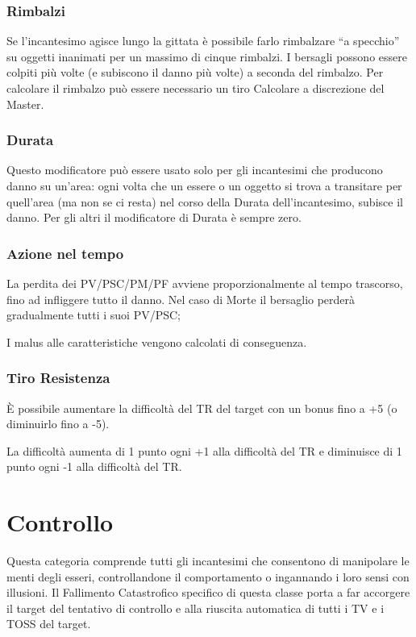 \subsubsection{Rimbalzi} Se l'incantesimo agisce lungo la gittata \`e possibile
farlo rimbalzare ``a specchio'' su oggetti inanimati per un massimo di cinque
rimbalzi. I bersagli possono essere colpiti pi\`u volte (e subiscono il danno
pi\`u volte) a seconda del rimbalzo. Per calcolare il rimbalzo pu\`o essere
necessario un tiro Calcolare a discrezione del Master.
\fi

\subsubsection{Durata} 

Questo modificatore pu\`o essere usato solo per gli incantesimi che
producono danno su un'area: ogni volta che un essere o un oggetto si
trova a transitare per quell'area (ma non se ci resta) nel corso della
Durata dell'incantesimo, subisce il danno. Per gli altri il
modificatore di Durata \`e sempre zero.

\iffullversion
\subsubsection{Azione nel tempo}
La perdita dei PV/PSC/PM/PF avviene proporzionalmente al tempo
trascorso, fino ad infliggere tutto il danno.  Nel caso di
Morte il bersaglio perder\`a gradualmente tutti i suoi PV/PSC;

I malus alle caratteristiche vengono calcolati di conseguenza.
\fi

\subsubsection{Tiro Resistenza} 

\`E possibile aumentare la difficolt\`a del TR del target con un
bonus fino a +5 (o diminuirlo fino a -5).

La difficolt\`a aumenta di 1 punto ogni +1 alla difficolt\`a del
TR e diminuisce di 1 punto ogni -1 alla difficolt\`a del TR.

\section{Controllo}

Questa categoria comprende tutti gli incantesimi che consentono di
manipolare le menti degli esseri, controllandone il comportamento o
ingannando i loro sensi con illusioni. Il Fallimento Catastrofico
specifico di questa classe porta a far accorgere il target del
tentativo di controllo e alla riuscita automatica di tutti i TV e i
TOSS del target.

